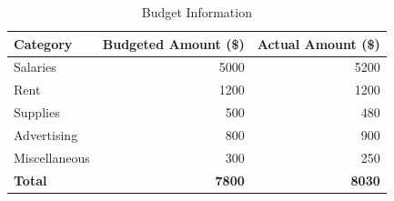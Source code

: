 \documentclass[a4paper,man,12pt]{article}
\begin{document}
  \begin{table}[ht]
    \centering %
    
    
    \caption{Budget Information}
    \label{tab:budget}
    
    
    \begin{tabular}{|l|r|r|}
      \hline %
      
      
      \textbf{Category} & \textbf{Budgeted Amount (\$)} & \textbf{Actual Amount (\$)} \\
      \hline %
      
      
      Salaries & 5000 & 5200 \\
      Rent & 1200 & 1200 \\
      Supplies & 500 & 480 \\
      Advertising & 800 & 900 \\
      Miscellaneous & 300 & 250 \\
      
      \hline %
      
      
      \textbf{Total} & \textbf{7800} & \textbf{8030} \\
      
      \hline %
    \end{tabular}
  \end{table}



\newpage
\printbibliography

\newpage

\appendix

\titleformat{\section}[block]{\normalfont\Large\bfseries\centering}{\thesection}{1em}{}
\end{document}
